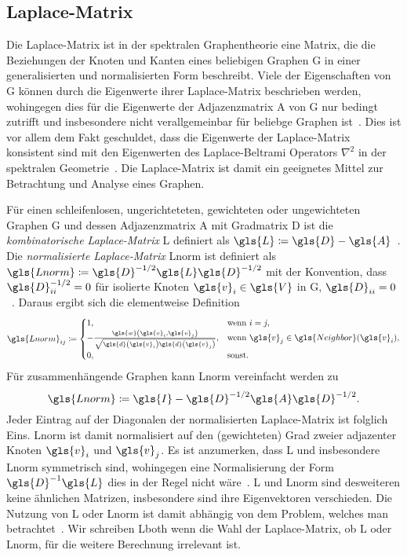 \subsection{Laplace-Matrix}
\label{laplace_matrix}

Die Laplace-Matrix ist in der spektralen Graphentheorie eine Matrix, die die Beziehungen der Knoten und Kanten eines beliebigen Graphen \gls{G} in einer generalisierten und normalisierten Form beschreibt.
Viele der Eigenschaften von \gls{G} können durch die Eigenwerte ihrer Laplace-Matrix beschrieben werden, wohingegen dies \bspw{} für die Eigenwerte der Adjazenzmatrix \gls{A} von \gls{G} nur bedingt zutrifft und insbesondere nicht verallgemeinbar für beliebge Graphen ist~\cite{Chung}.
Dies ist vor allem dem Fakt geschuldet, dass die Eigenwerte der Laplace-Matrix konsistent sind mit den Eigenwerten des Laplace-Beltrami Operators $\nabla^2$ in der spektralen Geometrie~\cite{Chung}.
Die Laplace-Matrix ist damit ein geeignetes Mittel zur Betrachtung und Analyse eines Graphen.

Für einen schleifenlosen, ungerichteteten, gewichteten oder ungewichteten Graphen \gls{G} und dessen Adjazenzmatrix \gls{A} mit Gradmatrix \gls{D} ist die \emph{kombinatorische Laplace-Matrix} \gls{L} definiert als $\gls{L} \coloneqq \gls{D} - \gls{A}$~\cite{Chung}.
Die \emph{normalisierte Laplace-Matrix} \gls{Lnorm} ist definiert als $\gls{Lnorm} \coloneqq \gls{D}^{-1/2} \gls{L} \gls{D}^{-1/2}$ mit der Konvention, dass $\gls{D}^{-1/2}_{ii} = 0$ für isolierte Knoten $\gls{v}_i \in \gls{V}$ in \gls{G}, \dhe{} $\gls{D}_{ii} = 0$~\cite{Chung}.
Daraus ergibt sich die elementweise Definition
\begin{equation*}
  \gls{Lnorm}_{ij} \coloneqq \begin{cases}
  1, & \text{wenn }i = j,\\
    -\frac{\gls{w}\left(\gls{v}_i, \gls{v}_j\right)}{\sqrt{\gls{d}\left(\gls{v}_i\right)\gls{d}\left(\gls{v}_j\right)}}, & \text{wenn }\gls{v}_j \in \gls{Neighbor}\left(\gls{v}_i\right),\\
  0, & \text{sonst.}
\end{cases}
\end{equation*}
Für zusammenhängende Graphen kann \gls{Lnorm} vereinfacht werden zu~\cite{Chung}
\begin{equation}
  \gls{Lnorm} \coloneqq \gls{I} - \gls{D}^{-1/2} \gls{A} \gls{D}^{-1/2}.
  \label{eq:laplace_norm_connected}
\end{equation}
Jeder Eintrag auf der Diagonalen der normalisierten Laplace-Matrix ist folglich Eins.
\gls{Lnorm} ist damit normalisiert auf den (gewichteten) Grad zweier adjazenter Knoten $\gls{v}_i$ und $\gls{v}_j$.
Es ist anzumerken, dass \gls{L} und insbesondere \gls{Lnorm} symmetrisch sind, wohingegen eine Normalisierung der Form $\gls{D}^{-1}\gls{L}$ dies in der Regel nicht wäre~\cite{Reuter}.
\gls{L} und \gls{Lnorm} sind desweiteren keine ähnlichen Matrizen, insbesondere sind ihre Eigenvektoren verschieden.
Die Nutzung von \gls{L} oder \gls{Lnorm} ist damit abhängig von dem Problem, welches man betrachtet~\cite{Hammond}.
Wir schreiben \gls{Lboth} wenn die Wahl der Laplace-Matrix, ob \gls{L} oder \gls{Lnorm}, für die weitere Berechnung irrelevant ist.

